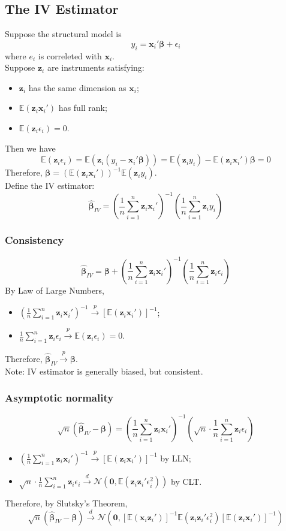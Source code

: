 \documentclass[%
 aip,
 jmp,%
 amsmath,amssymb,
 reprint,%
]{revtex4-1}
\def\N{{\mathbb N}}
\def\b{\beta}
\def\e{\epsilon}
\def\E{\mathbb{E}}
\def\N{\mathcal{N}} %
\def\pto{\overset{p}{\to}}
\def\dto{\overset{d}{\to}}
\def\h{\hat}
\def\l{\left}
\def\r{\right}
\newcommand{\mean}[1]{\frac{1}{n}\sum_{i=1}^{n} #1}
\renewcommand{\vec}[1]{\bm{#1}}
\begin{document}
\subsection{The IV Estimator}
Suppose the structural model is
$$ y_i = \vec x_i' \vec\b + \e_i $$
where $e_i$ is correleted with $\vec x_i$.\\

Suppose $\vec z_i$ are instruments satisfying:
\begin{itemize}
  \item $\vec z_i$ has the same dimension as $\vec x_i$;
  \item $\E(\vec z_i \vec x_i')$ has full rank;
  \item $\E(\vec z_i\e_i) = 0$.
\end{itemize}

Then we have
$$ \E(\vec z_i \e_i) = \E(\vec z_i (y_i - \vec x_i'\vec\b)) = \E(\vec z_i y_i) - \E(\vec z_i \vec x_i')\vec\b = 0 $$
Therefore, $\vec\b = (\E(\vec z_i\vec x_i'))^{-1}\E(\vec z_i y_i)$.\\

Define the IV estimator:
$$\vec{\h\b}_{IV} = \l(\mean \vec z_i \vec x_i'\r)^{-1} \l( \mean \vec z_i y_i \r)$$

\subsubsection{Consistency}
$$\vec{\h\b}_{IV} = \vec\b + \l(\mean \vec z_i \vec x_i'\r)^{-1} \l( \mean \vec z_i \e_i \r)$$
By Law of Large Numbers,
\begin{itemize}
  \item $\l(\mean \vec z_i \vec x_i'\r)^{-1} \pto [\E(\vec z_i \vec x_i')]^{-1}$;
  \item $\mean \vec z_i \e_i \pto \E(\vec z_i \e_i) = 0$.
\end{itemize}
Therefore, $\vec{\h\b}_{IV} \pto \vec\b$.\\

Note: IV estimator is generally biased, but consistent.

\subsubsection{Asymptotic normality}
$$ \sqrt{n}(\vec{\h\b}_{IV} - \vec\b) = \l(\mean \vec z_i \vec x_i'\r)^{-1} \l(\sqrt{n}\cdot \mean \vec z_i \e_i \r) $$

\begin{itemize}
  \item  $\l(\mean \vec z_i \vec x_i'\r)^{-1} \pto [\E(\vec z_i \vec x_i')]^{-1}$ by LLN;
  \item $\sqrt{n}\cdot \mean \vec z_i \e_i \dto \N(\vec 0, \E(\vec z_i \vec z_i'\e_i^2))$ by CLT.
\end{itemize}
Therefore, by Slutsky's Theorem,
$$\sqrt{n}(\vec{\h\b}_{IV} - \vec\b) \dto \N(\vec 0, [\E(\vec x_i \vec z_i')]^{-1}\E(\vec z_i \vec z_i'\e_i^2)[\E(\vec z_i \vec x_i')]^{-1} )$$
\end{document}
